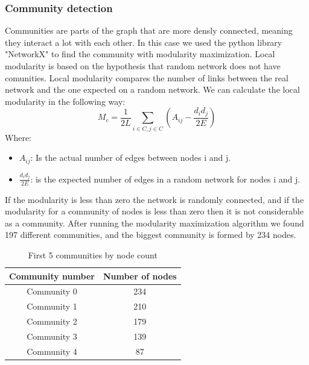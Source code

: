 \documentclass[12pt,journal,compsoc]{IEEEtran}
\begin{document}
\subsubsection{Community detection}
Communities are parts of the graph that are more densly connected, meaning they interact a lot with each other. In this case we used the python library "NetworkX\cite{NetworkX}" to find the community with modularity maximization. Local modularity is based on the hypothesis that random network does not have comunities. Local modularity\cite{Modularity} compares the number of links between the real network and the one expected on a random network. We can calculate the local modularity in the following way:
\[M_c = \frac{1}{2L}\sum_{i \in C, j\in C }(A_{ij} - \frac{d_id_j}{2E})\] 
Where:
\begin{itemize}[]
    \item $A_{ij}$: Is the actual number of edges between nodes i and j.
    \item $\frac{d_id_j}{2E}$: is the expected number of edges in a random network for nodes i and j.
\end{itemize}
If the modularity is less than zero the network is randomly connected, and if the modularity for a community of nodes is less than zero then it is not considerable as a community.
After running the modularity maximization algorithm we found 197 different communities, and the biggest community is formed by 234 nodes.
\begin{table}[ht]
	\centering
	\begin{tabular}{c c }
		Community number & Number of nodes  \\
		\hline
		Community 0& 234  \\
		Community 1& 210  \\
		Community 2& 179  \\
		Community 3& 139  \\
		Community 4& 87  \\
	\end{tabular}
	\caption{First 5 communities by node count}
	\end{table}
	
\end{document}
